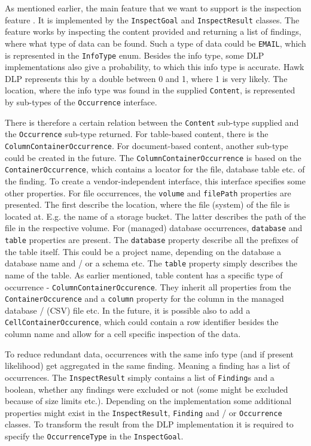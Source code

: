 As mentioned earlier, the main feature that we want to support is the inspection feature . It is implemented by the \texttt{InspectGoal} and \texttt{InspectResult} classes. The feature works by inspecting the content provided and returning a list of findings, where what type of data can be found. Such a type of data could be \texttt{EMAIL}, which is represented in the \texttt{InfoType} enum. Besides the info type, some DLP implementations also give a probability, to which this info type is accurate. Hawk DLP represents this by a double between 0 and 1, where 1 is very likely. The location, where the info type was found in the supplied \texttt{Content}, is represented by sub-types of the \texttt{Occurrence} interface. 

 There is therefore a certain relation between the \texttt{Content} sub-type supplied and the \texttt{Occurrence} sub-type returned. For table-based content, there is the \texttt{ColumnContainerOccurrence}. For document-based content, another sub-type could be created in the future. The \texttt{ColumnContainerOccurrence} is based on the \texttt{ContainerOccurrence}, which contains a locator for the file, database table etc. of the finding. To create a vendor-independent interface, this interface specifies some other properties. 
For file occurrences, the \texttt{volume} and \texttt{filePath} properties are presented. The first describe the location, where the file (system) of the file is located at. E.g. the name of a storage bucket. The latter describes the path of the file in the respective volume.
For (managed) database occurrences, \texttt{database} and \texttt{table} properties are present. The \texttt{database} property describe all the prefixes of the table itself. This could be a project name, depending on the database a database name and / or a schema etc. The \texttt{table} property simply describes the name of the table.
As earlier mentioned, table content has a specific type of occurrence - \texttt{ColumnContainerOccurence}. They inherit all properties from the \texttt{ContainerOccurence} and a \texttt{column} property for the column in the managed database / (CSV) file etc.
In the future, it is possible also to add a \texttt{CellContainerOccurence}, which could contain a row identifier besides the column name and allow for a cell specific inspection of the data.

To reduce redundant data, occurrences with the same info type (and if present likelihood) get aggregated in the same finding. Meaning a finding has a list of occurrences. The \texttt{InspectResult} simply contains a list of \texttt{Finding}s and a boolean, whether any findings were excluded or not (some might be excluded because of size limits etc.). Depending on the implementation some additional properties might exist in the \texttt{InspectResult}, \texttt{Finding} and / or \texttt{Occurrence} classes. To transform the result from the DLP implementation it is required to specify the \texttt{OccurrenceType} in the \texttt{InspectGoal}.


